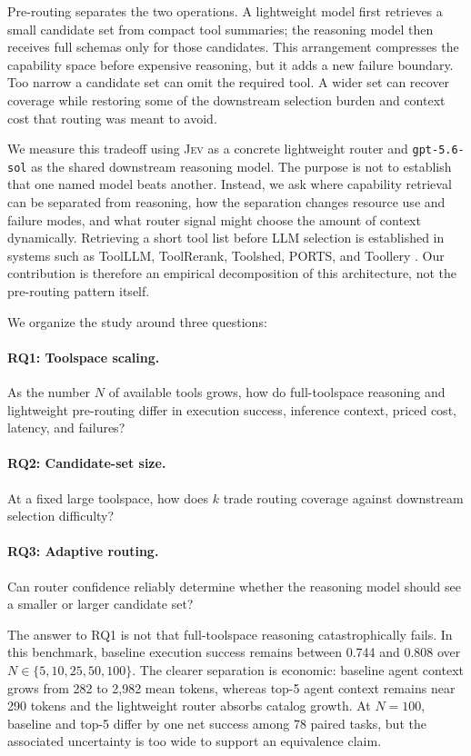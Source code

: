 \documentclass[10pt,twocolumn]{article}
\newcommand{\jev}{\textsc{Jev}}
\begin{document}
Pre-routing separates the two operations. A lightweight model first retrieves a small candidate set from compact tool summaries; the reasoning model then receives full schemas only for those candidates. This arrangement compresses the capability space before expensive reasoning, but it adds a new failure boundary. Too narrow a candidate set can omit the required tool. A wider set can recover coverage while restoring some of the downstream selection burden and context cost that routing was meant to avoid.

We measure this tradeoff using \jev{} as a concrete lightweight router and \texttt{gpt-5.6-sol} as the shared downstream reasoning model. The purpose is not to establish that one named model beats another. Instead, we ask where capability retrieval can be separated from reasoning, how the separation changes resource use and failure modes, and what router signal might choose the amount of context dynamically. Retrieving a short tool list before LLM selection is established in systems such as ToolLLM, ToolRerank, Toolshed, PORTS, and Toollery \cite{qin2023toolllm,zheng2024toolrerank,lumer2024toolshed,molfetta2025ports,tian2026toollery}. Our contribution is therefore an empirical decomposition of this architecture, not the pre-routing pattern itself.

We organize the study around three questions:

\paragraph{RQ1: Toolspace scaling.} As the number $N$ of available tools grows, how do full-toolspace reasoning and lightweight pre-routing differ in execution success, inference context, priced cost, latency, and failures?

\paragraph{RQ2: Candidate-set size.} At a fixed large toolspace, how does $k$ trade routing coverage against downstream selection difficulty?

\paragraph{RQ3: Adaptive routing.} Can router confidence reliably determine whether the reasoning model should see a smaller or larger candidate set?

The answer to RQ1 is not that full-toolspace reasoning catastrophically fails. In this benchmark, baseline execution success remains between 0.744 and 0.808 over $N\in\{5,10,25,50,100\}$. The clearer separation is economic: baseline agent context grows from 282 to 2,982 mean tokens, whereas top-5 agent context remains near 290 tokens and the lightweight router absorbs catalog growth. At $N=100$, baseline and top-5 differ by one net success among 78 paired tasks, but the associated uncertainty is too wide to support an equivalence claim.
\end{document}
